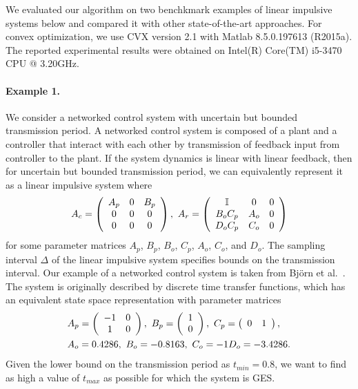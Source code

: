 We evaluated our algorithm on two benchkmark examples of linear
impulsive systems below and compared it with other state-of-the-art
approaches.  For convex optimization, we use CVX version 2.1 with
Matlab 8.5.0.197613 (R2015a).  The reported experimental results were
obtained on Intel(R) Core(TM) i5-3470 CPU @ 3.20GHz.

\paragraph{ Example 1.  } We consider a networked control system with
uncertain but bounded transmission period.  A networked control system
is composed of a plant and a controller that interact with each other
by transmission of feedback input from controller to the plant.  If
the system dynamics is linear with linear feedback, then for uncertain
but bounded transmission period, we can equivalently represent it
as a linear impulsive system where
%
\[A_c=\left(\begin{array}{ccc} A_p & 0 & B_p\\ 0 & 0 &
  0\\ 0 & 0 & 0
\end{array}\right),~A_r=\left(\begin{array}{ccc}
\mathbb{I} & 0 & 0\\
B_oC_p & A_o & 0\\
D_oC_p & C_o & 0
\end{array}\right)\]
%
for some parameter matrices $A_p$, $B_p$, $B_o$,
$C_p$, $A_o$, $C_o$, and $D_o$.  The sampling interval $\Delta$ of the
linear impulsive system specifies bounds on the transmission interval.
%
Our example of a networked control system is taken from Bj\"{o}rn et
al.~\cite{wittenmark2002computer}.  The system is originally described
by discrete time transfer functions, which has an equivalent state
space representation with parameter matrices
%
\begin{align*}
& A_p=\left(\begin{array}{cc}-1 & 0\\ 1 & 0\end{array}\right),
 ~ B_p=\left(\begin{array}{c}1\\ 0\end{array}\right),
~ C_p=\left(\begin{array}{cc}0 & 1\end{array}\right),\\& A_o=0.4286,~
      B_o=-0.8163,~ C_o=-1 D_o=-3.4286.
\end{align*}
%
Given the lower bound on the transmission period as $t_{min}=0.8$, we
want to find as high a value of $t_{max}$ as possible for which
the system is GES.

